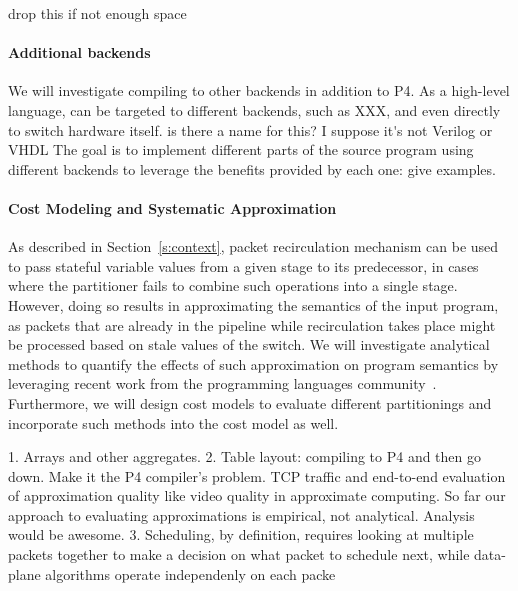 \ac{drop this if not enough space}
\paragraph{Additional backends}
We will investigate compiling \pktlanguage to other backends in addition to P4. 
As a high-level language, \pktlanguage can be targeted to different backends, 
such as XXX, and even directly 
to switch hardware itself. \ac{is there a name for this? I suppose
it's not Verilog or VHDL} The goal is to implement different parts of the source 
program using different backends to leverage the benefits provided by each one:
\ac{give examples}.


\paragraph{Cost Modeling and Systematic Approximation}
As described in Section~\ref{s:context}, 
packet recirculation mechanism can be used to pass stateful variable values  
from a given stage to its predecessor,
in cases where the partitioner fails to combine such
operations into a single stage.
However, doing so results in approximating the semantics of
the input \pktlanguage program, as packets that are already in the pipeline 
while recirculation takes place might be processed based on stale values of the
switch. We will investigate analytical methods to quantify the effects of
such approximation on program semantics by leveraging recent work from
the programming languages community~\cite{sampsonApprox, chisel}. 
Furthermore, we will design cost
models to evaluate different partitionings and incorporate such methods into
the cost model as well. 


1. Arrays and other aggregates.
2. Table layout: compiling to P4 and then go down. Make it the P4 compiler's problem.
TCP traffic and end-to-end evaluation of approximation quality like video quality in approximate computing.
So far our approach to evaluating approximations is empirical, not analytical. Analysis would be awesome.
3. Scheduling, by definition, requires looking at multiple packets together to
make a decision on what packet to schedule next, while data-plane algorithms
operate independenly on each packe
\fi
